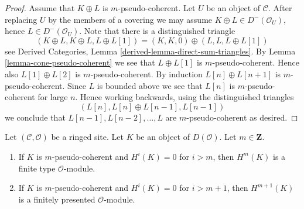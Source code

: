 \begin{proof}
Assume that $K \oplus L$ is $m$-pseudo-coherent. Let $U$ be an object of
$\mathcal{C}$. After replacing $U$ by the members of a covering we may
assume $K \oplus L \in D^-(\mathcal{O}_U)$, hence $L \in D^-(\mathcal{O}_U)$.
Note that there is a distinguished triangle
$$
(K \oplus L, K \oplus L, L \oplus L[1]) =
(K, K, 0) \oplus (L, L, L \oplus L[1])
$$
see
Derived Categories, Lemma \ref{derived-lemma-direct-sum-triangles}.
By
Lemma \ref{lemma-cone-pseudo-coherent}
we see that $L \oplus L[1]$ is $m$-pseudo-coherent.
Hence also $L[1] \oplus L[2]$ is $m$-pseudo-coherent.
By induction $L[n] \oplus L[n + 1]$ is $m$-pseudo-coherent.
Since $L$ is bounded above we see that $L[n]$ is $m$-pseudo-coherent
for large $n$. Hence working backwards, using the distinguished triangles
$$
(L[n], L[n] \oplus L[n - 1], L[n - 1])
$$
we conclude that $L[n - 1], L[n - 2], \ldots, L$ are $m$-pseudo-coherent
as desired.
\end{proof}

\begin{lemma}
\label{lemma-finite-cohomology}
Let $(\mathcal{C}, \mathcal{O})$ be a ringed site. Let $K$ be an object of
$D(\mathcal{O})$. Let $m \in \mathbf{Z}$.
\begin{enumerate}
\item If $K$ is $m$-pseudo-coherent and $H^i(K) = 0$
for $i > m$, then $H^m(K)$ is a finite type $\mathcal{O}$-module.
\item If $K$ is $m$-pseudo-coherent and $H^i(K) = 0$
for $i > m + 1$, then $H^{m + 1}(K)$ is a finitely presented
$\mathcal{O}$-module.
\end{enumerate}
\end{lemma}

